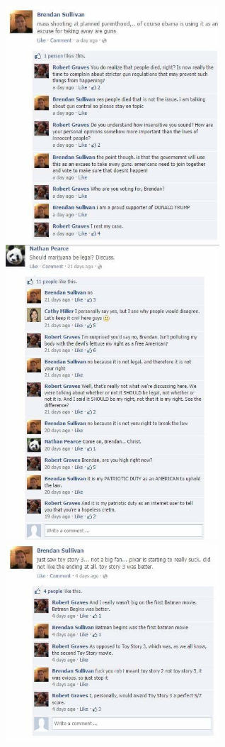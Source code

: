 \documentclass{42-en}
\begin{document}
	\includegraphics[width=8cm]{bren9.jpg}
	\includegraphics[width=8cm]{bren10.jpg}
	\includegraphics[width=8cm]{bren11.jpg}
\end{document}
